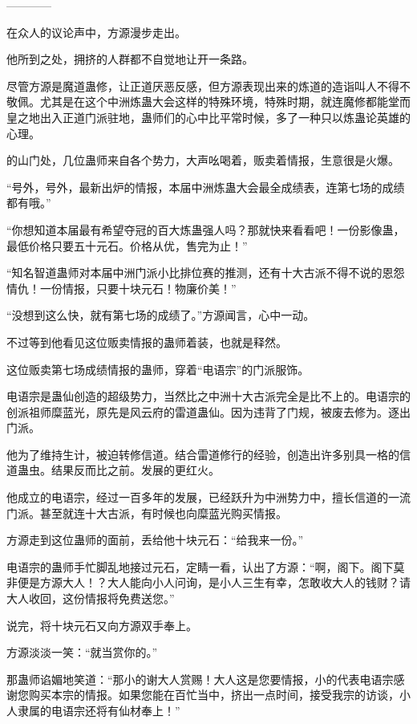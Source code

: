 
\begin{this_body}

------------

在众人的议论声中，方源漫步走出。

他所到之处，拥挤的人群都不自觉地让开一条路。

尽管方源是魔道蛊修，让正道厌恶反感，但方源表现出来的炼道的造诣叫人不得不敬佩。尤其是在这个中洲炼蛊大会这样的特殊环境，特殊时期，就连魔修都能堂而皇之地出入正道门派驻地，蛊师们的心中比平常时候，多了一种只以炼蛊论英雄的心理。

的山门处，几位蛊师来自各个势力，大声吆喝着，贩卖着情报，生意很是火爆。

“号外，号外，最新出炉的情报，本届中洲炼蛊大会最全成绩表，连第七场的成绩都有哦。”

“你想知道本届最有希望夺冠的百大炼蛊强人吗？那就快来看看吧！一份影像蛊，最低价格只要五十元石。价格从优，售完为止！”

“知名智道蛊师对本届中洲门派小比排位赛的推测，还有十大古派不得不说的恩怨情仇！一份情报，只要十块元石！物廉价美！”

“没想到这么快，就有第七场的成绩了。”方源闻言，心中一动。

不过等到他看见这位贩卖情报的蛊师着装，也就是释然。

这位贩卖第七场成绩情报的蛊师，穿着“电语宗”的门派服饰。

电语宗是蛊仙创造的超级势力，当然比之中洲十大古派完全是比不上的。电语宗的创派祖师糜蓝光，原先是风云府的雷道蛊仙。因为违背了门规，被废去修为。逐出门派。

他为了维持生计，被迫转修信道。结合雷道修行的经验，创造出许多别具一格的信道蛊虫。结果反而比之前。发展的更红火。

他成立的电语宗，经过一百多年的发展，已经跃升为中洲势力中，擅长信道的一流门派。甚至就连十大古派，有时候也向糜蓝光购买情报。

方源走到这位蛊师的面前，丢给他十块元石：“给我来一份。”

电语宗的蛊师手忙脚乱地接过元石，定睛一看，认出了方源：“啊，阁下。阁下莫非便是方源大人！？大人能向小人问询，是小人三生有幸，怎敢收大人的钱财？请大人收回，这份情报将免费送您。”

说完，将十块元石又向方源双手奉上。

方源淡淡一笑：“就当赏你的。”

那蛊师谄媚地笑道：“那小的谢大人赏赐！大人这是您要情报，小的代表电语宗感谢您购买本宗的情报。如果您能在百忙当中，挤出一点时间，接受我宗的访谈，小人隶属的电语宗还将有仙材奉上！”


\end{this_body}

